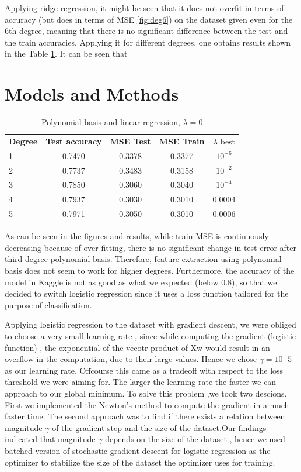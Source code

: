 \documentclass[10pt,conference,compsocconf]{IEEEtran}
\begin{document}
Applying ridge regression, it might be seen that it does not overfit in terms of accuracy (but does in terms of MSE \ref{fig:deg6}) on the dataset given even for the 6th degree, meaning that there is no significant difference between the test and the train accuracies. Applying it for different degrees, one obtains results shown in the Table \ref{tab:degrees}. It can be seen that 

\section{Models and Methods}
\begin{table}[!htb]
	\caption{Polynomial basis and linear regression, $\lambda=0$}	\label{tab:degrees}
	\centering\begin{tabular}{|lcccc|}\hline
		{\bf Degree} & {\bf Test accuracy} & {\bf MSE Test} & {\bf MSE Train} & {$\lambda$ best}\\
		1 & 0.7470 & 0.3378 & 0.3377 & $10^{-6}$\\
		2 & 0.7737 & 0.3483 & 0.3158 & $10^{-2}$\\		
		3 & 0.7850 & 0.3060 & 0.3040 & $10^{-4}$\\
		4 & 0.7937 & 0.3030 & 0.3010 & 0.0004\\
		5 & 0.7971 & 0.3050 & 0.3010 & 0.0006\\\hline
	\end{tabular}
\end{table}

As can be seen in the figures and results, while train MSE is continuously decreasing because of over-fitting, there is no significant change in test error after third degree polynomial basis. Therefore, feature extraction using polynomial basis does not seem to work for higher degrees. Furthermore, the accuracy of the model in Kaggle is not as good as what we expected (below 0.8), so that we decided to switch logistic regression since it uses a loss function tailored for the purpose of classification.


Applying logistic regression to the dataset with gradient descent, we were obliged to choose a very small learning rate , since while computing the gradient (logistic function) , the exponential of the vecotr product of Xw would result in an overflow in the computation, due to their large values. Hence we chose $\gamma = 10^-5$ as our learning rate. Offcourse this came as a tradeoff with respect to the loss threshold we were aiming for. The larger the learning rate the faster we can approach to our global minimum. To solve this problem ,we took two descions. First we implemented the Newton's method to compute the gradient in a much faster time. The second approach was to find if there exists a relation between magnitude $\gamma$ of the gradient step and the size of the dataset.Our findings indicated that  magnitude $\gamma$ depends on the size of the dataset , hence we used batched version of stochastic gradient descent for logistic regression as the optimizer to stabilize the size of the dataset the optimizer uses for training.
\end{document}
